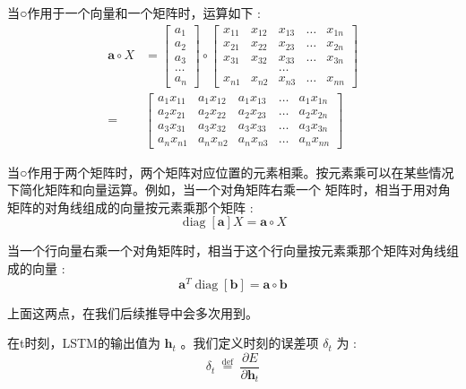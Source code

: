 \documentclass[10.5pt,compsoc]{CjC}
\theoremstyle{mystyle}
\begin{document}
当○作用于一个向量和一个矩阵时，运算如下 :
$$
\begin{aligned}
\mathbf{a} \circ X &=\left[\begin{array}{l}
a_{1} \\
a_{2} \\
a_{3} \\
\ldots \\
a_{n}
\end{array}\right] \circ\left[\begin{array}{lllll}
x_{11} & x_{12} & x_{13} & \ldots & x_{1 n} \\
x_{21} & x_{22} & x_{23} & \ldots & x_{2 n} \\
x_{31} & x_{32} & x_{33} & \ldots & x_{3 n} \\
& & \ldots & & \\
x_{n 1} & x_{n 2} & x_{n 3} & \ldots & x_{n n}
\end{array}\right] \\
=& {\left[\begin{array}{llllll}
a_{1} x_{11} & a_{1} x_{12} & a_{1} x_{13} & \ldots & a_{1} x_{1 n} \\
a_{2} x_{21} & a_{2} x_{22} & a_{2} x_{23} & \ldots & a_{2} x_{2 n} \\
a_{3} x_{31} & a_{3} x_{32} & a_{3} x_{33} & \ldots & a_{3} x_{3 n} \\
a_{n} x_{n 1} & a_{n} x_{n 2} & a_{n} x_{n 3} & \ldots & a_{n} x_{n n}
\end{array}\right] }
\end{aligned}
$$

当○作用于两个矩阵时，两个矩阵对应位置的元素相乘。按元素乘可以在某些情况下简化矩阵和向量运算。例如，当一个对角矩阵右乘一个 矩阵时，相当于用对角矩阵的对角线组成的向量按元素乘那个矩阵 :
$$
\operatorname{diag}[\mathbf{a}] X=\mathbf{a} \circ X
$$

当一个行向量右乘一个对角矩阵时，相当于这个行向量按元素乘那个矩阵对角线组成的向量 :
$$
\mathbf{a}^{T} \operatorname{diag}[\mathbf{b}]=\mathbf{a} \circ \mathbf{b}
$$

上面这两点，在我们后续推导中会多次用到。

在t时刻，LSTM的输出值为 $\mathbf{h}_{t}$ 。我们定义时刻的误差项 $\delta_{t}$ 为 :
$$
\delta_{t} \stackrel{\text { def }}{=} \frac{\partial E}{\partial \mathbf{h}_{t}}
$$
\end{document}
